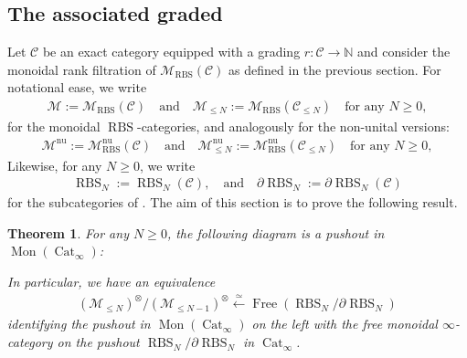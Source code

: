 \documentclass[12pt, reqno]{amsart}
\theoremstyle{plain}
\newtheorem{theorem}{Theorem}[section]
\theoremstyle{definition}
\newcommand{\N}{\mathbb N}
\begin{document}
\subsection{The associated graded}\label{associated graded}

Let $\mathcal{C}$ be an exact category equipped with a grading $r\colon \mathcal{C}\rightarrow \N$ and consider the monoidal rank filtration of $\mathscr{M}_{\operatorname{RBS}}(\mathcal{C})$ as defined in the previous section. For notational ease, we write
\begin{align*}
\mathscr{M}:=\mathscr{M}_{\operatorname{RBS}}(\mathcal{C}) \quad\text{and}\quad \mathscr{M}_{\leq N}:=\mathscr{M}_{\operatorname{RBS}}(\mathcal{C}_{\leq N})\quad\text{for any }N\geq 0,
\end{align*}
for the monoidal $\operatorname{RBS}$-categories, and analogously for the non-unital versions:
\begin{align*}
\mathscr{M}^{\operatorname{nu}}:=\mathscr{M}_{\operatorname{RBS}}^{\operatorname{nu}}(\mathcal{C}) \quad\text{and}\quad \mathscr{M}^{\operatorname{nu}}_{\leq N}:=\mathscr{M}_{\operatorname{RBS}}^{\operatorname{nu}}(\mathcal{C}_{\leq N})\quad\text{for any }N\geq 0,
\end{align*}
Likewise, for any $N\geq 0$, we write
\begin{align*}
\operatorname{RBS}_N:=\operatorname{RBS}_N(\mathcal{C}),\quad\text{and}\quad \partial\operatorname{RBS}_N:=\partial\operatorname{RBS}_N(\mathcal{C})
\end{align*}
for the subcategories of . The aim of this section is to prove the following result.

\begin{theorem}\label{E1-pushout diagram}
For any $N\geq 0$, the following diagram is a pushout in $\operatorname{Mon}(\operatorname{Cat}_\infty)$:
\begin{center}
\end{center}
In particular, we have an equivalence
\begin{align*}
(\mathscr{M}_{\leq N})^\otimes/(\mathscr{M}_{\leq N-1})^\otimes \xleftarrow{\ \simeq\ } \operatorname{Free}(\operatorname{RBS}_N/\partial \operatorname{RBS}_N)
\end{align*}
identifying the pushout in $\operatorname{Mon}(\operatorname{Cat}_\infty)$ on the left with the free monoidal $\infty$-category on the pushout $\operatorname{RBS}_N/\partial \operatorname{RBS}_N$ in $\operatorname{Cat}_\infty$.
\end{theorem}
\end{document}
